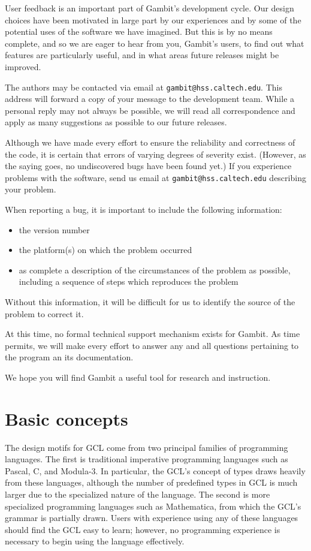 User feedback is an important part of Gambit's development cycle.
Our design choices have been motivated in large part by our experiences
and by some of the potential uses of the software we have imagined.
But this is by no means complete, and so we are eager to hear from
you, Gambit's users, to find out what features are particularly
useful, and in what areas future releases might be improved.

The authors may be contacted via email at {\tt gambit@hss.caltech.edu}.
This address will forward a copy of your message to the development team.
While a personal reply may not always be possible, we will read all
correspondence and apply as many suggestions as possible to our future
releases.

Although we have made every effort to ensure the reliability and correctness of the
code, it is certain that errors of varying degrees of severity exist.
(However, as the saying goes, no undiscovered bugs have been found yet.)  If you
experience problems with the software,
send us email at {\tt gambit@hss.caltech.edu} describing your problem.

When reporting a bug, it is important to include the following information:

\begin{itemize}
\item the version number
\item the platform(s) on which the problem occurred
\item as complete a description of the circumstances of the problem as possible, including a sequence of steps which reproduces the problem
\end{itemize}
 
\noindent Without this information, it will be difficult for us to identify the source of the
problem to correct it.

At this time, no formal technical support mechanism exists for Gambit.
As time permits, we will make every effort to answer any and all questions
pertaining to the program an its documentation.

We hope you will find Gambit a useful tool for research and instruction.


\section{Basic concepts}

The design motifs for GCL come from two principal families of programming
languages.  The first is traditional imperative programming languages
such as Pascal, C, and Modula-3.  In particular, the GCL's concept of
types draws heavily from these languages, although the number of
predefined types in GCL is much larger due to the specialized nature of
the language.  The second is more specialized programming languages such
as Mathematica, from which the GCL's grammar is partially drawn.  Users
with experience using any of these languages should find the GCL easy to
learn; however, no programming experience is necessary to begin using the
language effectively.


